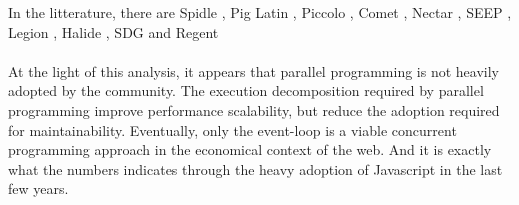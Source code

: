 In the litterature, there are
Spidle \cite{Consel2003},
Pig Latin \cite{Olston2008},
Piccolo \cite{Power2010},
Comet \cite{He2010},
Nectar \cite{Gunda2010},
SEEP \cite{Migliavacca2010},
Legion \cite{Bauer2012},
Halide \cite{Ragan-Kelley2013},
SDG \cite{Fernandez2014a} and
Regent \cite{Slaughter2015}


\paragraph{}

At the light of this analysis, it appears that parallel programming is not heavily adopted by the community.
The execution decomposition required by parallel programming improve performance scalability, but reduce the adoption required for maintainability.
Eventually, only the event-loop is a viable concurrent programming approach in the economical context of the web.
And it is exactly what the numbers indicates through the heavy adoption of Javascript in the last few years.

